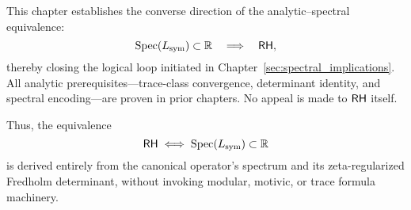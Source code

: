 \begin{remark}
\label{rem:structural_role_of_ch8}

This chapter establishes the converse direction of the analytic–spectral equivalence:
\[
\operatorname{Spec}(L_{\mathrm{sym}}) \subset \mathbb{R} \quad \Longrightarrow \quad \mathsf{RH},
\]
thereby closing the logical loop initiated in Chapter~\ref{sec:spectral_implications}. All analytic prerequisites—trace-class convergence, determinant identity, and spectral encoding—are proven in prior chapters. No appeal is made to \(\mathsf{RH}\) itself.

\medskip

\noindent
Thus, the equivalence
\[
\mathsf{RH} \iff \operatorname{Spec}(L_{\mathrm{sym}}) \subset \mathbb{R}
\]
is derived entirely from the canonical operator's spectrum and its zeta-regularized Fredholm determinant, without invoking modular, motivic, or trace formula machinery.
\end{remark}
